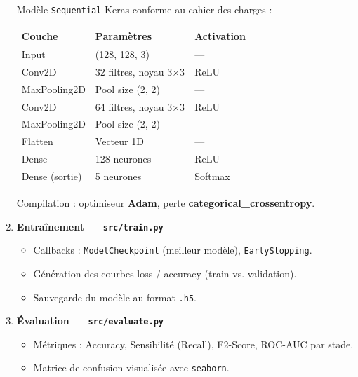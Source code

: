 \documentclass[12pt,a4paper]{article}
\begin{document}
\begin{enumerate}[label=\textbf{Étape \arabic*.}, leftmargin=2.5cm, itemsep=0.4cm]
  Modèle \texttt{Sequential} Keras conforme au cahier des charges :

  \vspace{0.3cm}
  \begin{center}
  \begin{tabular}{|l|l|l|}
  \hline
  \rowcolor{primaryBlue!15}
  \textbf{Couche} & \textbf{Paramètres} & \textbf{Activation} \\
  \hline
  Input       & (128, 128, 3)            & —       \\
  Conv2D      & 32 filtres, noyau 3×3    & ReLU    \\
  MaxPooling2D & Pool size (2, 2)        & —       \\
  Conv2D      & 64 filtres, noyau 3×3    & ReLU    \\
  MaxPooling2D & Pool size (2, 2)        & —       \\
  Flatten     & Vecteur 1D               & —       \\
  Dense       & 128 neurones             & ReLU    \\
  Dense (sortie) & 5 neurones            & Softmax \\
  \hline
  \end{tabular}
  \end{center}
  \vspace{0.3cm}
  Compilation : optimiseur \textbf{Adam}, perte \textbf{categorical\_crossentropy}.

  \item \textbf{Entraînement — \texttt{src/train.py}}
  \begin{itemize}
    \item Callbacks : \texttt{ModelCheckpoint} (meilleur modèle), \texttt{EarlyStopping}.
    \item Génération des courbes loss / accuracy (train vs. validation).
    \item Sauvegarde du modèle au format \texttt{.h5}.
  \end{itemize}

  \item \textbf{Évaluation — \texttt{src/evaluate.py}}
  \begin{itemize}
    \item Métriques : Accuracy, Sensibilité (Recall), F2-Score, ROC-AUC par stade.
    \item Matrice de confusion visualisée avec \texttt{seaborn}.
  \end{itemize}

\end{enumerate}
\end{document}
